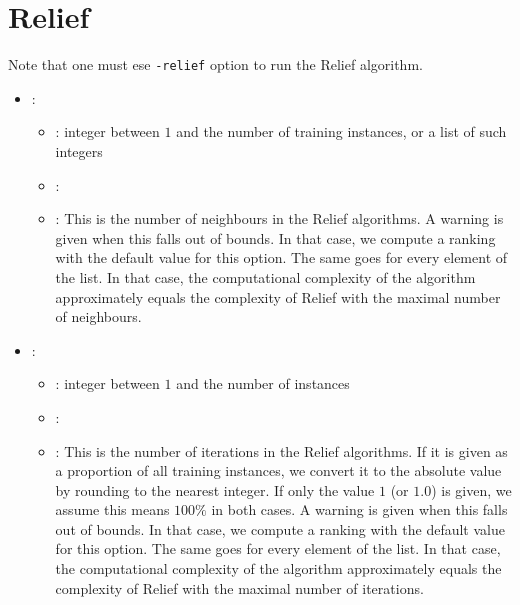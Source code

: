 \section{Relief}
Note that one must ese \texttt{-relief} option to run the Relief algorithm.

\begin{itemize}
    \item {}:
           \begin{itemize}
                \item \optionPossibleValues{}: integer between $1$ and the number of training instances, or a list of such integers
                \item \optionDefaultValue{}: 
                \item \optionDescrption{}: This is the number of neighbours in the Relief algorithms. A warning is given
                                           when this falls out of bounds. In that case, we compute a ranking with the default value for this option.
                                           The same goes for every element of the list. In that case, the computational complexity of the algorithm
                                           approximately equals the complexity of Relief with the maximal number of neighbours.
           \end{itemize}
    \item {}:
           \begin{itemize}
                \item \optionPossibleValues{}: integer between $1$ and the number of instances
                \item \optionDefaultValue{}: 
                \item \optionDescrption{}: This is the number of iterations in the Relief algorithms. If it is given as a proportion
                                           of all training instances, we convert it to the absolute value by rounding to the nearest integer.
                                           If only the value $1$ (or $1.0$) is given, we assume this means $100\%$ in both cases. A warning is given
                                           when this falls out of bounds. In that case, we compute a ranking with the default value for this option.
                                           The same goes for every element of the list. In that case, the computational complexity of the algorithm
                                           approximately equals the complexity of Relief with the maximal number of iterations.

\end{itemize}
\end{itemize}

